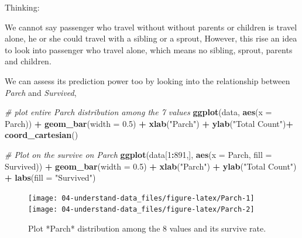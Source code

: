 \documentclass[
]{book}
\newenvironment{Shaded}{\begin{snugshade}}{\end{snugshade}}
\newcommand{\CommentTok}[1]{\textcolor[rgb]{0.56,0.35,0.01}{\textit{#1}}}
\newcommand{\DataTypeTok}[1]{\textcolor[rgb]{0.13,0.29,0.53}{#1}}
\newcommand{\DecValTok}[1]{\textcolor[rgb]{0.00,0.00,0.81}{#1}}
\newcommand{\FloatTok}[1]{\textcolor[rgb]{0.00,0.00,0.81}{#1}}
\newcommand{\KeywordTok}[1]{\textcolor[rgb]{0.13,0.29,0.53}{\textbf{#1}}}
\newcommand{\NormalTok}[1]{#1}
\newcommand{\OperatorTok}[1]{\textcolor[rgb]{0.81,0.36,0.00}{\textbf{#1}}}
\newcommand{\StringTok}[1]{\textcolor[rgb]{0.31,0.60,0.02}{#1}}
\begin{document}
\begin{rmdthinking}
Thinking:

We cannot say passenger who travel without without parents or children is travel alone, he or she could travel with a sibling or a sprout, However, this rise an idea to look into passenger who travel alone, which means no sibling, sprout, parents and children.
\end{rmdthinking}

We can assess its prediction power too by looking into the relationship between \emph{Parch} and \emph{Survived},

\begin{Shaded}
\begin{Highlighting}[]
\CommentTok{# plot entire Parch distribution among the 7 values}
\KeywordTok{ggplot}\NormalTok{(data, }\KeywordTok{aes}\NormalTok{(}\DataTypeTok{x =}\NormalTok{ Parch)) }\OperatorTok{+}
\StringTok{  }\KeywordTok{geom_bar}\NormalTok{(}\DataTypeTok{width =} \FloatTok{0.5}\NormalTok{) }\OperatorTok{+}
\StringTok{  }\KeywordTok{xlab}\NormalTok{(}\StringTok{"Parch"}\NormalTok{) }\OperatorTok{+}
\StringTok{  }\KeywordTok{ylab}\NormalTok{(}\StringTok{"Total Count"}\NormalTok{)}\OperatorTok{+}
\StringTok{  }\KeywordTok{coord_cartesian}\NormalTok{()}

\CommentTok{# Plot on the survive on Parch}
\KeywordTok{ggplot}\NormalTok{(data[}\DecValTok{1}\OperatorTok{:}\DecValTok{891}\NormalTok{,], }\KeywordTok{aes}\NormalTok{(}\DataTypeTok{x =}\NormalTok{ Parch, }\DataTypeTok{fill =}\NormalTok{ Survived)) }\OperatorTok{+}
\StringTok{  }\KeywordTok{geom_bar}\NormalTok{(}\DataTypeTok{width =} \FloatTok{0.5}\NormalTok{) }\OperatorTok{+}
\StringTok{  }\KeywordTok{xlab}\NormalTok{(}\StringTok{"Parch"}\NormalTok{) }\OperatorTok{+}
\StringTok{  }\KeywordTok{ylab}\NormalTok{(}\StringTok{"Total Count"}\NormalTok{)  }\OperatorTok{+}
\StringTok{  }\KeywordTok{labs}\NormalTok{(}\DataTypeTok{fill =} \StringTok{"Survived"}\NormalTok{)}
\end{Highlighting}
\end{Shaded}

\begin{figure}

{\centering \texttt{[image: 04-understand-data\_files/figure-latex/Parch-1]} \texttt{[image: 04-understand-data\_files/figure-latex/Parch-2]} 

}

\caption{Plot *Parch* distribution among the 8 values and its survive rate.}\label{fig:Parch}
\end{figure}
\end{document}
